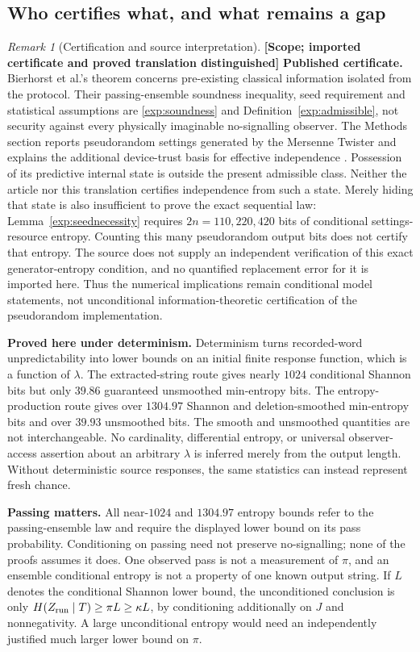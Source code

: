 \documentclass[11pt,a4paper]{article}
\theoremstyle{definition}
\theoremstyle{remark}\newtheorem{remark}[theorem]{Remark}
\newcommand{\status}[1]{\textbf{[#1]}\quad}
\begin{document}
\subsection{Who certifies what, and what remains a gap}\label{exp:whocertifies}
\begin{remark}[Certification and source interpretation]
\status{Scope; imported certificate and proved translation distinguished}
\textbf{Published certificate.} Bierhorst et al.'s theorem concerns pre-existing classical information isolated from the protocol. Their passing-ensemble soundness inequality, seed requirement and statistical assumptions are \eqref{exp:soundness} and Definition~\ref{exp:admissible}, not security against every physically imaginable no-signalling observer. The Methods section reports pseudorandom settings generated by the Mersenne Twister and explains the additional device-trust basis for effective independence \cite{Bierhorst18}. Possession of its predictive internal state is outside the present admissible class. Neither the article nor this translation certifies independence from such a state. Merely hiding that state is also insufficient to prove the exact sequential law: Lemma~\ref{exp:seednecessity} requires $2n=110{,}220{,}420$ bits of conditional settings-resource entropy. Counting this many pseudorandom output bits does not certify that entropy. The source does not supply an independent verification of this exact generator-entropy condition, and no quantified replacement error for it is imported here. Thus the numerical implications remain conditional model statements, not unconditional information-theoretic certification of the pseudorandom implementation.

\textbf{Proved here under determinism.} Determinism turns recorded-word unpredictability into lower bounds on an initial finite response function, which is a function of $\lambda$. The extracted-string route gives nearly $1024$ conditional Shannon bits but only $39.86$ guaranteed unsmoothed min-entropy bits. The entropy-production route gives over $1304.97$ Shannon and deletion-smoothed min-entropy bits and over $39.93$ unsmoothed bits. The smooth and unsmoothed quantities are not interchangeable. No cardinality, differential entropy, or universal observer-access assertion about an arbitrary $\lambda$ is inferred merely from the output length. Without deterministic source responses, the same statistics can instead represent fresh chance.

\textbf{Passing matters.} All near-$1024$ and $1304.97$ entropy bounds refer to the passing-ensemble law and require the displayed lower bound on its pass probability. Conditioning on passing need not preserve no-signalling; none of the proofs assumes it does. One observed pass is not a measurement of $\pi$, and an ensemble conditional entropy is not a property of one known output string. If $L$ denotes the conditional Shannon lower bound, the unconditioned conclusion is only $H(Z_{\rm run}\mid T)\ge\pi L\ge\kappa L$, by conditioning additionally on $J$ and nonnegativity. A large unconditional entropy would need an independently justified much larger lower bound on $\pi$.
\end{remark}
\end{document}
